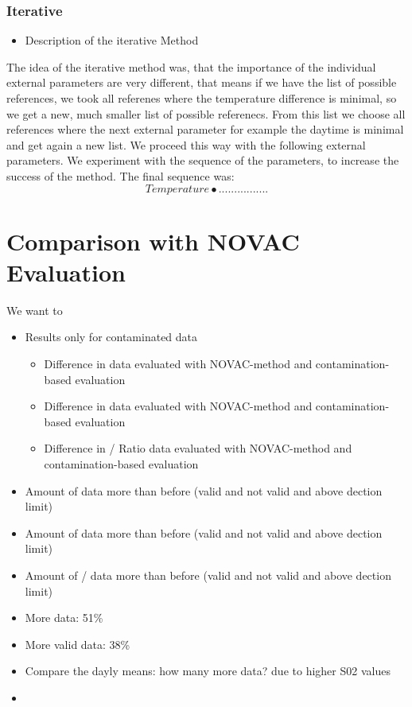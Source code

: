 \documentclass  [
  paper    = a4,
  BCOR     = 10mm,
  twoside,
  fontsize = 12pt,
  fleqn,
  toc      = bibnumbered,
  toc      = listofnumbered,
  numbers  = noendperiod,
  headings = normal,
  listof   = leveldown,
  version  = 3.03
]                                       {scrreprt}
\begin{document}
	\subsection{Iterative}
	\begin{itemize}
		\item Description of the iterative Method
	\end{itemize}
	The idea of the iterative method was, that the importance of the individual external parameters are very different, that means if we have the list of possible references, we took all referenes where the temperature difference is minimal, so we get a new, much smaller list of possible referenecs. From this list we choose all references where the next external parameter for example the daytime is minimal and get again a new list. We proceed this way with the following external parameters. We experiment with the sequence of the parameters, to increase the success of the method. The final sequence was:
	\begin{equation*}
	Temperature \bullet ................
	\end{equation*} 
	
	\chapter{Comparison with NOVAC Evaluation}
	We want to 
	\begin{itemize}
		\item Results only for contaminated data
		\begin{itemize}
			\item Difference in  data evaluated with NOVAC-method and contamination-based evaluation
			\item Difference in  data evaluated with NOVAC-method and contamination-based evaluation
			\item Difference in / Ratio data evaluated with NOVAC-method and contamination-based evaluation
		\end{itemize}
		\item Amount of  data more than before (valid and not valid and above dection limit)
		\item Amount of  data more than before (valid and not valid and above dection limit)
		\item Amount of / data more than before (valid and not valid and above dection limit)
		\item More  data: 51\%
		\item  More valid  data: 38\%
		\item Compare the dayly means: how many more data? due to higher S02 values
		\item 
	\end{itemize}
\end{document}
